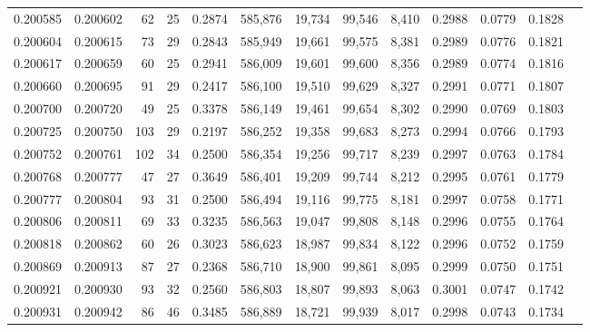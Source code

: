 \begin{tabular}{rrrrrrrrrrrrr}
0.200585 & 0.200602 &    62 &  25 &                                     0.2874 & 585,876 &  19,734 &  99,546 &   8,410 & 0.2988 & 0.0779 & 0.1828 \\
0.200604 & 0.200615 &    73 &  29 &                                     0.2843 & 585,949 &  19,661 &  99,575 &   8,381 & 0.2989 & 0.0776 & 0.1821 \\
0.200617 & 0.200659 &    60 &  25 &                                     0.2941 & 586,009 &  19,601 &  99,600 &   8,356 & 0.2989 & 0.0774 & 0.1816 \\
0.200660 & 0.200695 &    91 &  29 &                                     0.2417 & 586,100 &  19,510 &  99,629 &   8,327 & 0.2991 & 0.0771 & 0.1807 \\
0.200700 & 0.200720 &    49 &  25 &                                     0.3378 & 586,149 &  19,461 &  99,654 &   8,302 & 0.2990 & 0.0769 & 0.1803 \\
0.200725 & 0.200750 &   103 &  29 &                                     0.2197 & 586,252 &  19,358 &  99,683 &   8,273 & 0.2994 & 0.0766 & 0.1793 \\
0.200752 & 0.200761 &   102 &  34 &                                     0.2500 & 586,354 &  19,256 &  99,717 &   8,239 & 0.2997 & 0.0763 & 0.1784 \\
0.200768 & 0.200777 &    47 &  27 &                                     0.3649 & 586,401 &  19,209 &  99,744 &   8,212 & 0.2995 & 0.0761 & 0.1779 \\
0.200777 & 0.200804 &    93 &  31 &                                     0.2500 & 586,494 &  19,116 &  99,775 &   8,181 & 0.2997 & 0.0758 & 0.1771 \\
0.200806 & 0.200811 &    69 &  33 &                                     0.3235 & 586,563 &  19,047 &  99,808 &   8,148 & 0.2996 & 0.0755 & 0.1764 \\
0.200818 & 0.200862 &    60 &  26 &                                     0.3023 & 586,623 &  18,987 &  99,834 &   8,122 & 0.2996 & 0.0752 & 0.1759 \\
0.200869 & 0.200913 &    87 &  27 &                                     0.2368 & 586,710 &  18,900 &  99,861 &   8,095 & 0.2999 & 0.0750 & 0.1751 \\
0.200921 & 0.200930 &    93 &  32 &                                     0.2560 & 586,803 &  18,807 &  99,893 &   8,063 & 0.3001 & 0.0747 & 0.1742 \\
0.200931 & 0.200942 &    86 &  46 &                                     0.3485 & 586,889 &  18,721 &  99,939 &   8,017 & 0.2998 & 0.0743 & 0.1734 \\

\end{tabular}
